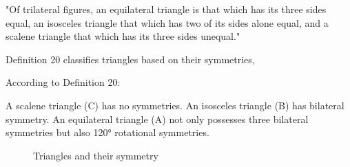 
\begin{defin}
"Of trilateral figures, an equilateral triangle is that which has its three sides equal, an isosceles triangle that which has two of its sides alone equal, and a scalene triangle that which has its three sides unequal."
\end{defin}

Definition 20 classifies triangles based on their symmetries,

According to Definition 20:

A scalene triangle (C) has no symmetries.
An isosceles triangle (B) has bilateral symmetry.
An equilateral triangle (A) not only possesses three bilateral symmetries but also 120° rotational symmetries.

\begin{figure}[h]
\begin{subfigure}{0.305\textwidth}
\centering
{}
\end{subfigure}
\begin{subfigure}{0.35\textwidth}
\end{subfigure}
\begin{subfigure}{0.31\textwidth}
\end{subfigure}
\caption{Triangles and their symmetry}
\end{figure}


